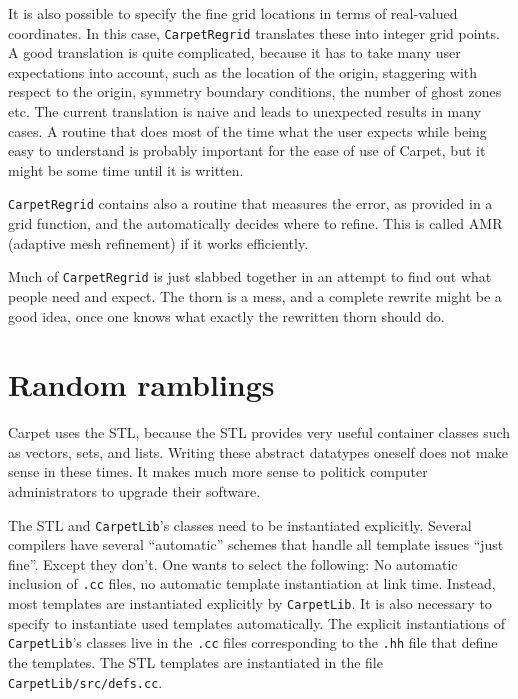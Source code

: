 \documentclass{article}
\begin{document}
   It is also possible to specify the fine grid locations in terms of
   real-valued coordinates.  In this case, \texttt{CarpetRegrid}
   translates these into integer grid points.  A good translation is
   quite complicated, because it has to take many user expectations
   into account, such as the location of the origin, staggering with
   respect to the origin, symmetry boundary conditions, the number of
   ghost zones etc.  The current translation is naive and leads to
   unexpected results in many cases.  A routine that does most of the
   time what the user expects while being easy to understand is
   probably important for the ease of use of Carpet, but it might be
   some time until it is written.

   \texttt{CarpetRegrid} contains also a routine that measures the
   error, as provided in a grid function, and the automatically
   decides where to refine.  This is called AMR (adaptive mesh
   refinement) if it works efficiently.

   Much of \texttt{CarpetRegrid} is just slabbed together in an
   attempt to find out what people need and expect.  The thorn is a
   mess, and a complete rewrite might be a good idea, once one knows
   what exactly the rewritten thorn should do.



\section{Random ramblings}

   Carpet uses the STL, because the STL provides very useful container
   classes such as vectors, sets, and lists.  Writing these abstract
   datatypes oneself does not make sense in these times.  It makes
   much more sense to politick computer administrators to upgrade
   their software.

   The STL and \texttt{CarpetLib}'s classes need to be instantiated
   explicitly.  Several compilers have several ``automatic'' schemes
   that handle all template issues ``just fine''.  Except they don't.
   One wants to select the following: No automatic inclusion of
   \texttt{.cc} files, no automatic template instantiation at link
   time.  Instead, most templates are instantiated explicitly by
   \texttt{CarpetLib}.  It is also necessary to specify to instantiate
   used templates automatically.  The explicit instantiations of
   \texttt{CarpetLib}'s classes live in the \texttt{.cc} files
   corresponding to the \texttt{.hh} file that define the templates.
   The STL templates are instantiated in the file
   \texttt{CarpetLib/src/defs.cc}.
\end{document}
